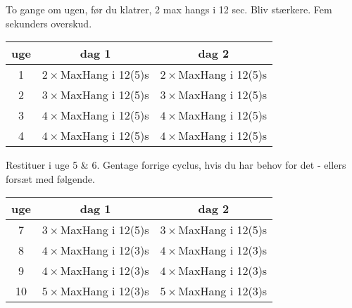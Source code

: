 To gange om ugen, før du klatrer, 2 max hangs
i 12 sec. Bliv stærkere. Fem sekunders overskud.

\begin{table}[h!]
  \centering
  \begin{tabular}{c| c c}
    \textbf{uge} & \textbf{dag 1} & \textbf{dag 2} \\ \hline
    1 & $2\times$MaxHang i 12(5)s & $2\times$MaxHang i 12(5)s \\
    2 & $3\times$MaxHang i 12(5)s & $3\times$MaxHang i 12(5)s \\
    3 & $4\times$MaxHang i 12(5)s & $4\times$MaxHang i 12(5)s \\
    4 & $4\times$MaxHang i 12(5)s & $4\times$MaxHang i 12(5)s \\
  \end{tabular}
\end{table}

  \vspace{1em}
  \raggedright

  Restituer i uge 5 {\&} 6. Gentage forrige cyclus, hvis du har behov for det -
  ellers fors\ae t med f\o lgende.

\begin{table}[h!]
  \centering
  \begin{tabular}{c| c c}
    \textbf{uge} & \textbf{dag 1} & \textbf{dag 2} \\ \hline
    7 & $3\times$MaxHang i 12(5)s & $3\times$MaxHang i 12(5)s \\
    8 & $4\times$MaxHang i 12(3)s & $4\times$MaxHang i 12(3)s \\
    9 & $4\times$MaxHang i 12(3)s & $4\times$MaxHang i 12(3)s \\
    10 & $5\times$MaxHang i 12(3)s & $5\times$MaxHang i 12(3)s \\
  \end{tabular}
\end{table}
